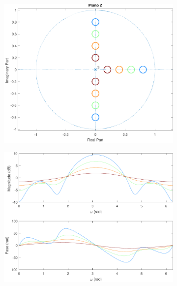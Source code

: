 \documentclass[a4paper,11pt]{article}
\numberwithin{figure}{section}
\numberwithin{equation}{section}
\numberwithin{table}{section}
\theoremstyle{definition}
\begin{document}
\begin{figure}[ht]
	\centering
	\begin{subfigure}{0.44\textwidth}
		\includegraphics[width=\textwidth]{ex_3_pz_4}
	\end{subfigure}
	\begin{subfigure}{0.44\textwidth}
		\includegraphics[width=\textwidth]{ex_3_bode_4}
	\end{subfigure}\\
	\begin{subfigure}{0.44\textwidth}

\end{subfigure}
\end{figure}
\end{document}
